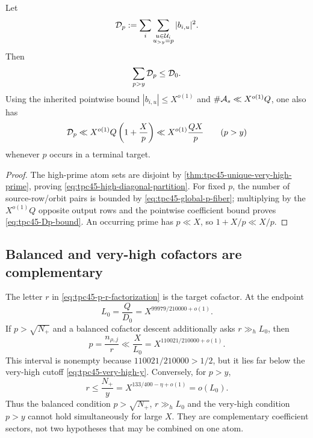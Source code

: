 \begin{corollary}
\label{cor:tpc45-very-high-atomic-mass}
Let
\begin{equation}
 \mathcal D_p:=\sum_i\sum_{\substack{u\in\mathcal U_i\\u_{>y}=p}}|b_{i,u}|^2.
 \label{eq:tpc45-Dp}
\end{equation}
Then
\begin{equation}
 \sum_{p>y}\mathcal D_p\le\mathcal D_0.
 \label{eq:tpc45-high-diagonal-partition}
\end{equation}
Using the inherited pointwise bound \(|b_{i,u}|\le X^{o(1)}\) and
\(\#\mathcal A_s\ll X^{o(1)}Q\), one also has
\begin{equation}
 \mathcal D_p\ll X^{o(1)}Q\left(1+\frac Xp\right)
 \ll X^{o(1)}\frac{QX}{p}
 \qquad(p>y)
 \label{eq:tpc45-Dp-bound}
\end{equation}
whenever \(p\) occurs in a terminal target.
\end{corollary}

\begin{proof}
The high-prime atom sets are disjoint by
\cref{thm:tpc45-unique-very-high-prime}, proving
\eqref{eq:tpc45-high-diagonal-partition}.  For fixed \(p\), the number
of source-row/orbit pairs is bounded by
\eqref{eq:tpc45-global-p-fiber}; multiplying by the
\(X^{o(1)}Q\) opposite output rows and the pointwise coefficient bound
proves \eqref{eq:tpc45-Dp-bound}.  An occurring prime has
\(p\ll X\), so \(1+X/p\ll X/p\).
\end{proof}

\subsection{Balanced and very-high cofactors are complementary}

The letter \(r\) in \eqref{eq:tpc45-p-r-factorization} is the target
cofactor.  At the endpoint
\begin{equation}
 L_0=\frac Q{D_0}
 =X^{99979/210000+o(1)}.
 \label{eq:tpc45-L0-exponent}
\end{equation}
If \(p>\sqrt{N_+}\) and a balanced cofactor descent additionally asks
\(r\gg_h L_0\), then
\begin{equation}
 p=\frac{n_{\rho,j}}r
 \ll\frac X{L_0}
 =X^{110021/210000+o(1)}.
 \label{eq:tpc45-balanced-p-upper}
\end{equation}
This interval is nonempty because
\(110021/210000>1/2\), but it lies far below the very-high cutoff
\eqref{eq:tpc45-very-high-y}.  Conversely, for \(p>y\),
\begin{equation}
 r\le\frac{N_+}{y}
 =X^{133/400-\eta+o(1)}
 =o(L_0).
 \label{eq:tpc45-very-high-r-small}
\end{equation}
Thus the balanced condition \(p>\sqrt{N_+}\), \(r\gg_h L_0\) and the
very-high condition \(p>y\) cannot hold simultaneously for large
\(X\).  They are complementary coefficient sectors, not two hypotheses
that may be combined on one atom.
